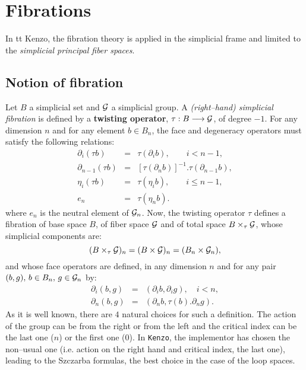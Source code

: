 \chapter {Fibrations}

In {tt Kenzo}, the fibration theory is applied in the simplicial frame
and limited to the {\em simplicial principal fiber spaces}.

\section {Notion of fibration}

Let $B$ a simplicial set and $\cal G$ a simplicial group. A {\em (right--hand) simplicial fibration} is
defined by a {\bf twisting operator}, $\tau : B \longrightarrow {\cal G}$, 
of degree $-1$.
For any dimension $n$ and for any element $b \in B_n$, the face and degeneracy operators must
satisfy the following relations:
\begin{eqnarray*}
\partial_i(\tau b) & = & \tau(\partial_i b), \qquad i < n-1, \\
\partial_{n-1}(\tau b) & = & [\tau(\partial_n b)]^{-1}.\tau(\partial_{n-1} b), \\
\eta_i(\tau b)  & = & \tau (\eta_i b), \qquad i \leq n-1, \\
e_n             & = & \tau(\eta_n b). 
\end{eqnarray*}
where $e_n$ is the neutral element of ${\cal G}_n$.
\vskip 0.30cm
Now, the twisting operator $\tau$ defines a fibration of base space $B$, of fiber space $\cal G$
and of total space $B \times_{\tau} {\cal G}$, whose simplicial components  are:
$$ (B \times_{\tau} {\cal G})_n = (B \times {\cal G})_n = (B_n \times {\cal G}_n), $$
and whose  face operators are defined, 
in any dimension $n$ and for any pair $(b,g),\, b \in B_n,\, g \in {\cal G}_n$ by:
\begin{eqnarray*}
\partial_i(b,g) & = & (\partial_i b, \partial_i g), \quad i < n, \\
\partial_n(b,g) & = & (\partial_n b, \tau(b).\partial_n g).
\end{eqnarray*}
As it is well known, there are $4$ natural choices for such a definition. The action of the
group can be from the right or from the left and the critical index can be the last one ($n$) or
the first one ($0$). In {\tt Kenzo}, the implementor has chosen the non--usual one (i.e. action
on the right hand and critical index, the last one), leading to the
Szczarba formulas, the best choice in the case of the loop spaces.

